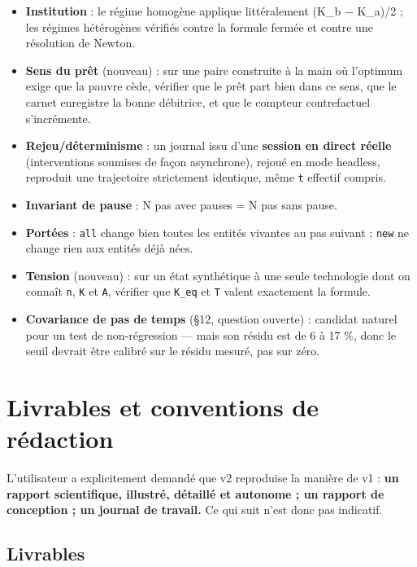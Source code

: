 \documentclass[11pt,a4paper]{article}
\newcommand{\code}[1]{\texttt{#1}}
\begin{document}
\begin{itemize}
\item \textbf{Institution} : le régime homogène applique littéralement (K\_b \ensuremath{-} K\_a)/2 ; les régimes hétérogènes vérifiés contre la formule fermée et contre une résolution de Newton.
\item \textbf{Sens du prêt} (nouveau) : sur une paire construite à la main où l'optimum exige que la pauvre cède, vérifier que le prêt part bien dans ce sens, que le carnet enregistre la bonne débitrice, et que le compteur contrefactuel s'incrémente.
\item \textbf{Rejeu/déterminisme} : un journal issu d'une \textbf{session en direct réelle} (interventions soumises de façon asynchrone), rejoué en mode headless, reproduit une trajectoire strictement identique, même \code{t} effectif compris.
\item \textbf{Invariant de pause} : N pas avec pauses = N pas sans pause.
\item \textbf{Portées} : \code{all} change bien toutes les entités vivantes au pas suivant ; \code{new} ne change rien aux entités déjà nées.
\item \textbf{Tension} (nouveau) : sur un état synthétique à une seule technologie dont on connaît \code{n}, \code{K} et \code{A}, vérifier que \code{K\_eq} et \code{T} valent exactement la formule.
\item \textbf{Covariance de pas de temps} (§12, question ouverte) : candidat naturel pour un test de non-régression --- mais son résidu est de 6 à 17 \%, donc le seuil devrait être calibré sur le résidu mesuré, pas sur zéro.
\end{itemize}

\bigskip

\setcounter{section}{9}
\section{Livrables et conventions de rédaction}

L'utilisateur a explicitement demandé que v2 reproduise la manière de v1 : \textbf{un rapport scientifique, illustré, détaillé et autonome ; un rapport de conception ; un journal de travail.} Ce qui suit n'est donc pas indicatif.

\subsection*{Livrables}
\end{document}
